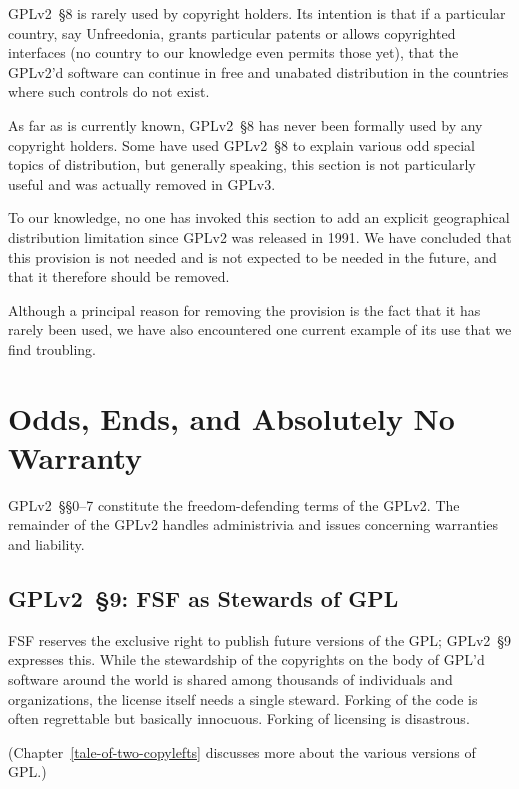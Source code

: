 GPLv2~\S8 is rarely used by copyright holders.  Its intention is that if a
particular country, say Unfreedonia, grants particular patents or allows
copyrighted interfaces (no country to our knowledge even permits those
yet), that the GPLv2'd software can continue in free and unabated
distribution in the countries where such controls do not exist.

As far as is currently known, GPLv2~\S8 has never been formally used by any
copyright holders.  Some have used GPLv2~\S8 to explain various odd special
topics of distribution, but generally speaking, this section is not
particularly useful and was actually removed in GPLv3.


To our knowledge, no one has invoked this section to add an explicit
geographical distribution limitation since GPLv2 was released in 1991. We
have concluded that this provision is not needed and is not expected to be
needed in the future, and that it therefore should be removed.

Although a principal reason for removing the provision is the fact that it
has rarely been used, we have also encountered one current example of its use
that we find troubling.

\chapter{Odds, Ends, and Absolutely No Warranty}

GPLv2~\S\S0--7 constitute the freedom-defending terms of the GPLv2.  The remainder
of the GPLv2 handles administrivia and issues concerning warranties and
liability.

\section{GPLv2~\S9: FSF as Stewards of GPL}
\label{GPLv2s9}

FSF reserves the exclusive right to publish future versions of the GPL\@;
GPLv2~\S9 expresses this.  While the stewardship of the copyrights on the body
of GPL'd software around the world is shared among thousands of
individuals and organizations, the license itself needs a single steward.
Forking of the code is often regrettable but basically innocuous.  Forking
of licensing is disastrous.

(Chapter~\ref{tale-of-two-copylefts} discusses more about the various
versions of GPL.)

